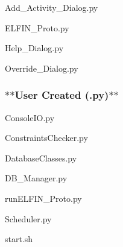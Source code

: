 \begin{DoxyItemize}
\item Add\-\_\-\-Activity\-\_\-\-Dialog.\-py
\item E\-L\-F\-I\-N\-\_\-\-Proto.\-py
\item Help\-\_\-\-Dialog.\-py
\item Override\-\_\-\-Dialog.\-py
\end{DoxyItemize}

\subsubsection*{$\ast$$\ast$\-User Created (.py)$\ast$$\ast$}


\begin{DoxyItemize}
\item Console\-I\-O.\-py
\item Constraints\-Checker.\-py
\item Database\-Classes.\-py
\item D\-B\-\_\-\-Manager.\-py
\item run\-E\-L\-F\-I\-N\-\_\-\-Proto.\-py
\item Scheduler.\-py
\item start.\-sh 
\end{DoxyItemize}